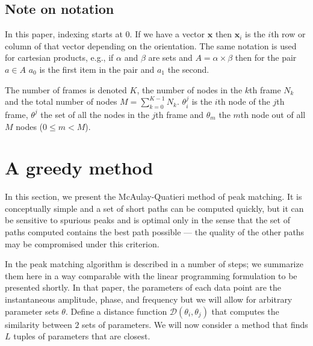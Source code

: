 \documentclass{article}
\newcommand{\BS}[1]{\boldsymbol{#1}}
\begin{document}
\begin{sloppy}
\subsection{Note on notation}

In this paper, indexing starts at 0. If we have a vector $\BS{x}$ then
$\BS{x}_{i}$ is the $i$th row or column of that vector depending on the
orientation. The same notation is used for cartesian products, e.g., if $\alpha$
and $\beta$ are sets and $A =
\alpha \times \beta$ then for the pair $a \in A$ $a_{0}$ is the first item in
the pair and $a_{1}$ the second.

The number of frames is denoted $K$, the number of nodes in the $k$th frame $N_k$ and
the total number of nodes $M = \sum_{k=0}^{K-1} N_{k}$. $\theta_{i}^{j}$ is the
$i$th node of the $j$th frame, $\theta^{j}$ the set of all the nodes in the
$j$th frame and $\theta_{m}$ the $m$th node out of all $M$ nodes ($0 \leq m <
M$).


\section{A greedy method}

In this section, we present the McAulay-Quatieri method of peak matching. It is
conceptually simple and a set of short paths can be computed quickly, but
it can be sensitive to spurious peaks and is optimal only in the sense that
the set of paths computed contains the best path possible --- the quality of the
other paths may be compromised under this criterion.

In \cite[q.~748]{mcaulay1986speech} the peak matching algorithm is described in
a number of steps; we summarize them here in a way comparable with the linear
programming formulation to be presented shortly. In that paper, the parameters
of each data point are the instantaneous amplitude, phase, and frequency but we
will allow for arbitrary parameter sets $\theta$.  Define a distance function
$\mathcal{D}
\left( \theta_{i},\theta_{j} \right)$ that computes the
similarity between $2$ sets of parameters. We will now consider a method that
finds $L$ tuples of parameters that are closest.


\end{sloppy}
\end{document}

